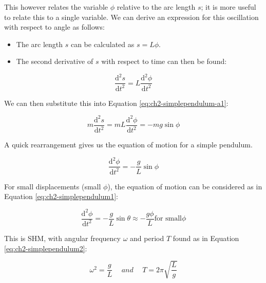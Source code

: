 \documentclass[
]{book}
\providecommand{\tightlist}{%
  \setlength{\itemsep}{0pt}\setlength{\parskip}{0pt}}
\begin{document}
This however relates the variable \(\phi\) relative to the arc length \(s\); it is more useful to relate this to a single variable. We can derive an expression for this oscillation with respect to angle as follows:

\begin{itemize}
\tightlist
\item
  The arc length \(s\) can be calculated as \(s = L \phi\).
\item
  The second derivative of \(s\) with respect to time can then be found:
\end{itemize}

\begin{equation}
\frac{\mathrm{d}^2 s}{\mathrm{d} t^2} = L \frac{\mathrm{d}^2 \phi}{\mathrm{d} t^2}
\label{eq:ch2-simplependulum-a2}
\end{equation}

We can then substitute this into Equation \eqref{eq:ch2-simplependulum-a1}:

\begin{equation}
m \frac{\mathrm{d}^2 s}{\mathrm{d} t^2} = m L \frac{\mathrm{d}^2 \phi}{\mathrm{d} t^2} =  -mg \sin \phi
\label{eq:ch2-simplependulum-a3}
\end{equation}

A quick rearrangement gives us the equation of motion for a simple pendulum.

\begin{equation}
\frac{\mathrm{d}^2 \phi}{\mathrm{d} t^2} =  -\frac{g}{L} \sin \phi
\label{eq:ch2-simplependulum-a3}
\end{equation}

For small displacements (small \(\phi\)), the equation of motion can be considered as in Equation \eqref{eq:ch2-simplependulum1}:

\begin{equation}
\frac{\mathrm{d}^2 \phi}{\mathrm{d} t^2} = -\frac{g}{L}\sin \theta \approx -\frac{g \phi}{L} \textrm{for small} \phi
\label{eq:ch2-simplependulum1}
\end{equation}

This is SHM, with angular frequency \(\omega\) and period \(T\) found as in Equation \eqref{eq:ch2-simplependulum2}:

\begin{equation}
\omega^2 = \frac{g}{L} \hspace{15pt} and \hspace{15pt} T = 2\pi \sqrt{\frac{L}{g}}
\label{eq:ch2-simplependulum2}
\end{equation}
\end{document}
